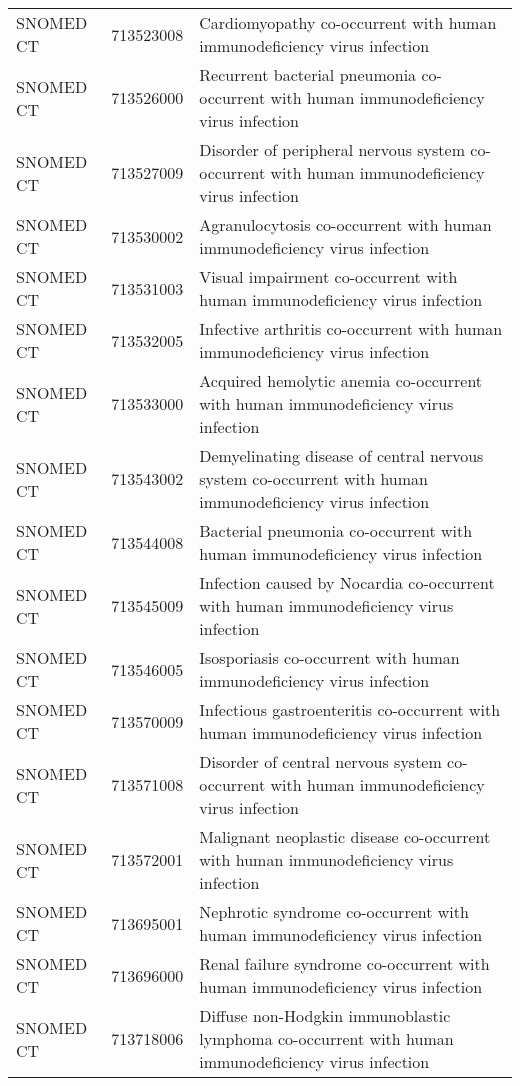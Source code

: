 \begin{longtable}{p{}p{}p{}}
  SNOMED CT & 713523008 & Cardiomyopathy co-occurrent with human immunodeficiency virus infection \\ 
  SNOMED CT & 713526000 & Recurrent bacterial pneumonia co-occurrent with human immunodeficiency virus infection \\ 
  SNOMED CT & 713527009 & Disorder of peripheral nervous system co-occurrent with human immunodeficiency virus infection \\ 
  SNOMED CT & 713530002 & Agranulocytosis co-occurrent with human immunodeficiency virus infection \\ 
  SNOMED CT & 713531003 & Visual impairment co-occurrent with human immunodeficiency virus infection \\ 
  SNOMED CT & 713532005 & Infective arthritis co-occurrent with human immunodeficiency virus infection \\ 
  SNOMED CT & 713533000 & Acquired hemolytic anemia co-occurrent with human immunodeficiency virus infection \\ 
  SNOMED CT & 713543002 & Demyelinating disease of central nervous system co-occurrent with human immunodeficiency virus infection \\ 
  SNOMED CT & 713544008 & Bacterial pneumonia co-occurrent with human immunodeficiency virus infection \\ 
  SNOMED CT & 713545009 & Infection caused by Nocardia co-occurrent with human immunodeficiency virus infection \\ 
  SNOMED CT & 713546005 & Isosporiasis co-occurrent with human immunodeficiency virus infection \\ 
  SNOMED CT & 713570009 & Infectious gastroenteritis co-occurrent with human immunodeficiency virus infection \\ 
  SNOMED CT & 713571008 & Disorder of central nervous system co-occurrent with human immunodeficiency virus infection \\ 
  SNOMED CT & 713572001 & Malignant neoplastic disease co-occurrent with human immunodeficiency virus infection \\ 
  SNOMED CT & 713695001 & Nephrotic syndrome co-occurrent with human immunodeficiency virus infection \\ 
  SNOMED CT & 713696000 & Renal failure syndrome co-occurrent with human immunodeficiency virus infection \\ 
  SNOMED CT & 713718006 & Diffuse non-Hodgkin immunoblastic lymphoma co-occurrent with human immunodeficiency virus infection \\ 

\end{longtable}
